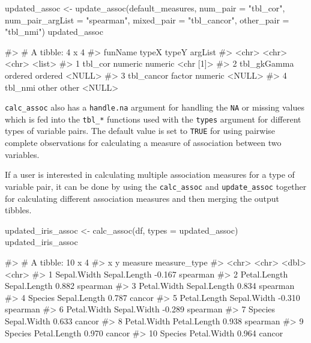 \begin{Schunk}
\begin{Sinput}
updated_assoc <- update_assoc(default_measures,
                              num_pair = "tbl_cor",
                              num_pair_argList = "spearman",
                              mixed_pair = "tbl_cancor",
                              other_pair = "tbl_nmi")
updated_assoc
\end{Sinput}
\begin{Soutput}
#> # A tibble: 4 x 4
#>   funName     typeX   typeY   argList  
#>   <chr>       <chr>   <chr>   <list>   
#> 1 tbl_cor     numeric numeric <chr [1]>
#> 2 tbl_gkGamma ordered ordered <NULL>   
#> 3 tbl_cancor  factor  numeric <NULL>   
#> 4 tbl_nmi     other   other   <NULL>
\end{Soutput}
\end{Schunk}

\texttt{calc\_assoc} also has a \texttt{handle.na} argument for handling
the \texttt{NA} or missing values which is fed into the \texttt{tbl\_*}
functions used with the \texttt{types} argument for different types of
variable pairs. The default value is set to \texttt{TRUE} for using
pairwise complete observations for calculating a measure of association
between two variables.

If a user is interested in calculating multiple association measures for
a type of variable pair, it can be done by using the
\texttt{calc\_assoc} and \texttt{update\_assoc} together for calculating
different association measures and then merging the output tibbles.

\begin{Schunk}
\begin{Sinput}
updated_iris_assoc <- calc_assoc(df, types = updated_assoc)
updated_iris_assoc
\end{Sinput}
\begin{Soutput}
#> # A tibble: 10 x 4
#>    x            y            measure measure_type
#>    <chr>        <chr>          <dbl> <chr>       
#>  1 Sepal.Width  Sepal.Length  -0.167 spearman    
#>  2 Petal.Length Sepal.Length   0.882 spearman    
#>  3 Petal.Width  Sepal.Length   0.834 spearman    
#>  4 Species      Sepal.Length   0.787 cancor      
#>  5 Petal.Length Sepal.Width   -0.310 spearman    
#>  6 Petal.Width  Sepal.Width   -0.289 spearman    
#>  7 Species      Sepal.Width    0.633 cancor      
#>  8 Petal.Width  Petal.Length   0.938 spearman    
#>  9 Species      Petal.Length   0.970 cancor      
#> 10 Species      Petal.Width    0.964 cancor
\end{Soutput}
\end{Schunk}

